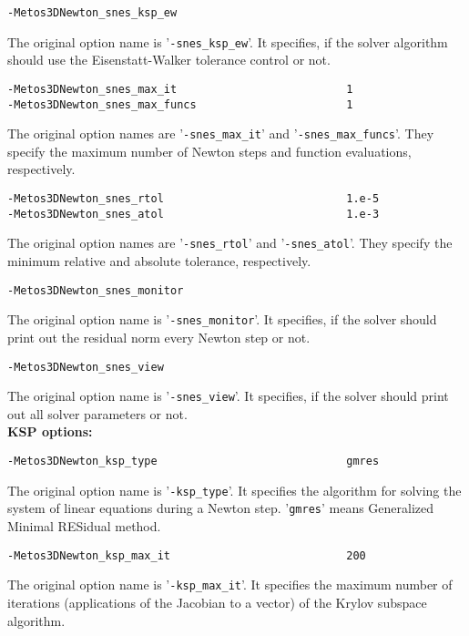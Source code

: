 \documentclass{article}
\begin{document}
\begin{verbatim}
-Metos3DNewton_snes_ksp_ew
\end{verbatim}
The original option name is '\texttt{-snes\_ksp\_ew}'. It specifies,
if the solver algorithm should use the Eisenstatt-Walker \cite{EisWal1996}
tolerance control or not.

\begin{verbatim}
-Metos3DNewton_snes_max_it                          1
-Metos3DNewton_snes_max_funcs                       1
\end{verbatim}
The original option names are '\texttt{-snes\_max\_it}' and '\texttt{-snes\_max\_funcs}'.
They specify the maximum number of Newton steps and function evaluations,
respectively.

\begin{verbatim}
-Metos3DNewton_snes_rtol                            1.e-5
-Metos3DNewton_snes_atol                            1.e-3
\end{verbatim}
The original option names are '\texttt{-snes\_rtol}' and '\texttt{-snes\_atol}'.
They specify the minimum relative and absolute tolerance,
respectively.

\begin{verbatim}
-Metos3DNewton_snes_monitor
\end{verbatim}
The original option name is '\texttt{-snes\_monitor}'. It specifies,
if the solver should print out the residual norm every Newton step or not.

\begin{verbatim}
-Metos3DNewton_snes_view
\end{verbatim}
The original option name is '\texttt{-snes\_view}'. It specifies,
if the solver should print out all solver parameters or not. \\

\textbf{KSP options:}

\begin{verbatim}
-Metos3DNewton_ksp_type                             gmres
\end{verbatim}
The original option name is '\texttt{-ksp\_type}'. It specifies the
algorithm for solving the system of linear equations during a
Newton step. '\texttt{gmres}' means Generalized Minimal RESidual method.

\begin{verbatim}
-Metos3DNewton_ksp_max_it                           200
\end{verbatim}
The original option name is '\texttt{-ksp\_max\_it}'. 
It specifies the maximum number of iterations (applications of the
Jacobian to a vector) of the Krylov subspace algorithm.
\end{document}
